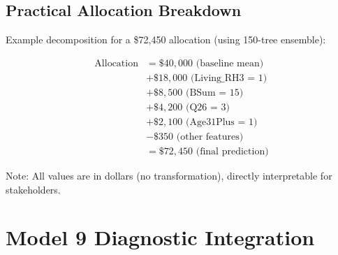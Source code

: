 \subsection{Practical Allocation Breakdown}

Example decomposition for a \$72,450 allocation (using 150-tree ensemble):

\begin{align}
\text{Allocation} &= \$40,000 \text{ (baseline mean)} \nonumber \\
&+ \$18,000 \text{ (Living\_RH3 = 1)} \nonumber \\
&+ \$8,500 \text{ (BSum = 15)} \nonumber \\
&+ \$4,200 \text{ (Q26 = 3)} \nonumber \\
&+ \$2,100 \text{ (Age31Plus = 1)} \nonumber \\
&- \$350 \text{ (other features)} \nonumber \\
&= \$72,450 \text{ (final prediction)}
\label{eq:allocation_example}
\end{align}

Note: All values are in dollars (no transformation), directly interpretable for stakeholders.

\section{Model 9 Diagnostic Integration}


